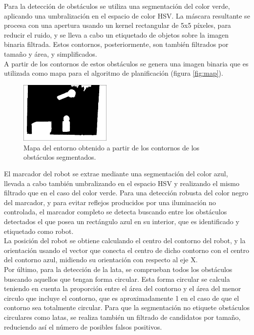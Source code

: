 Para la detección de obstáculos se utiliza una segmentación del color verde, aplicando una umbralización en el espacio de color HSV. La máscara resultante se procesa con una apertura usando un kernel rectangular de 5x5 píxeles, para reducir el ruido, y se lleva a cabo un etiquetado de objetos sobre la imagen binaria filtrada. Estos contornos, posteriormente, son también filtrados por tamaño y área, y simplificados.\\

A partir de los contornos de estos obstáculos se genera una imagen binaria que es utilizada como mapa para el algoritmo de planificación (figura \ref{fig:map}).\\

\begin{figure}[H]
        \centering
        \includegraphics[width=0.4\textwidth]{images/map.png}
        \caption{Mapa del entorno obtenido a partir de los contornos de los obstáculos segmentados.}
        \label{fig:foto_estructura_nave}
\end{figure} 

El marcador del robot se extrae mediante una segmentación del color azul, llevada a cabo también umbralizando en el espacio HSV y realizando el mismo filtrado que en el caso del color verde. Para una detección robusta del color negro del marcador, y para evitar reflejos producidos por una iluminación no controlada, el marcador completo se detecta buscando entre los obstáculos detectados el que posea un rectángulo azul en su interior, que es identificado y etiquetado como robot.\\ 

La posición del robot se obtiene calculando el centro del contorno del robot, y la orientación usando el vector que conecta el centro de dicho contorno con el centro del contorno azul, midiendo su orientación con respecto al eje X.\\

Por último, para la detección de la lata, se comprueban todos los obstáculos buscando aquellos que tengan forma circular. Esta forma circular se calcula teniendo en cuenta la proporción entre el área del contorno y el área del menor circulo que incluye el contorno, que es aproximadamente 1 en el caso de que el contorno sea totalmente circular. Para que la segmentación no etiquete obstáculos circulares como latas, se realiza también un filtrado de candidatos por tamaño, reduciendo así el número de posibles falsos positivos.\\

